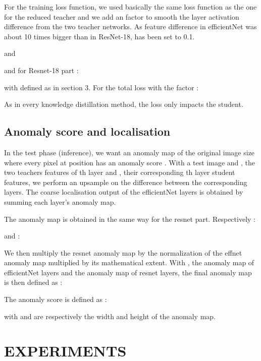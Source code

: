\documentclass[a4paper,twoside]{article}
\begin{document}
For the training loss function, we used basically the same loss function as the one for the reduced teacher and we add an  factor to smooth the layer activation difference from the two teacher networks. As feature difference in efficientNet was about 10 times bigger than in ResNet-18,   has been set to 0.1.




and 




\noindent and for Resnet-18 part : 



\noindent with  defined as in section 3. For the total loss with the  factor : 



As in every knowledge distillation method, the loss only impacts the student.


\subsection{Anomaly score and localisation}

In the test phase (inference), we want  an anomaly map  of the original image size where every pixel at
position   has an anomaly score . With a test
image  and  ,  the two teachers features
of th layer and ,  their corresponding
th layer student features, 
we perform an upsample on the difference between the corresponding layers. The
coarse localisation output of the efficientNet layers is
obtained by summing each layer’s anomaly map.

The anomaly map is obtained in the same way for the resnet part.
Respectively : 

and : 


We then multiply the resnet anomaly map by the normalization of the effnet anomaly map multiplied by its mathematical extent. 
With  , the anomaly
map of efficientNet layers and  the anomaly
map of resnet layers, the final anomaly map is then defined
as : 






\noindent The anomaly score is defined as :



\noindent with  and  are respectively the width and height of the anomaly map.


\section{EXPERIMENTS}
\end{document}
